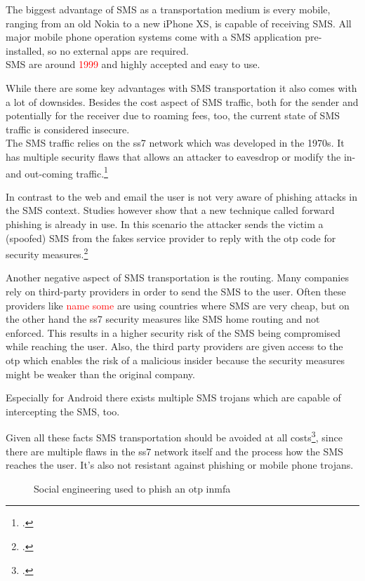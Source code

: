 The biggest advantage of SMS as a transportation medium is every mobile, ranging from an old Nokia to a new iPhone XS, is capable of receiving SMS. All major mobile phone operation systems come with a SMS application pre-installed, so no external apps are required.\\
SMS are around \textcolor{red}{1999} and highly accepted and easy to use.

While there are some key advantages with SMS transportation it also comes with a lot of downsides. Besides the cost aspect of SMS traffic, both for the sender and potentially for the receiver due to roaming fees, too, the current state of SMS traffic is considered insecure.\\
The SMS traffic relies on the \gls{ss7} network which was developed in the 1970s. It has multiple security flaws that allows an attacker to eavesdrop or modify the in- and out-coming traffic.\footcite{WELCH201717,7997246,puzankov2017stealthy}

In contrast to the web and email the user is not very aware of phishing attacks in the SMS context. Studies however show that a new technique called forward phishing is already in use. In this scenario the attacker sends the victim a (spoofed) SMS from the fakes service provider to reply with the \gls{otp} code for security measures.\footcite{JAKOBSSON20186,SIADATI201714}

Another negative aspect of SMS transportation is the routing. Many companies rely on third-party providers in order to send the SMS to the user. Often these providers like \textcolor{red}{name some} are using countries where SMS are very cheap, but on the other hand the \gls{ss7} security measures like SMS home routing and not enforced. This results in a higher security risk of the SMS being compromised while reaching the user. Also, the third party providers are given access to the \gls{otp} which enables the risk of a malicious insider because the security measures might be weaker than the original company.

Especially for Android there exists multiple SMS trojans which are capable of intercepting the SMS, too.

Given all these facts SMS transportation should be avoided at all costs\footcite{JAKOBSSON20186}, since there are multiple flaws in the \gls{ss7} network itself and the process how the SMS reaches the user. It's also not resistant against phishing or mobile phone trojans.


\begin{figure}[hbt]
	\centering
	
	\caption[Social engineering used to phish an \gls{otp} in \gls{mfa}]{Social engineering used to phish an \gls{otp} in\gls{mfa}\footnotemark}
	\label{fig:2fa_flow_sim_hack}
\end{figure}

